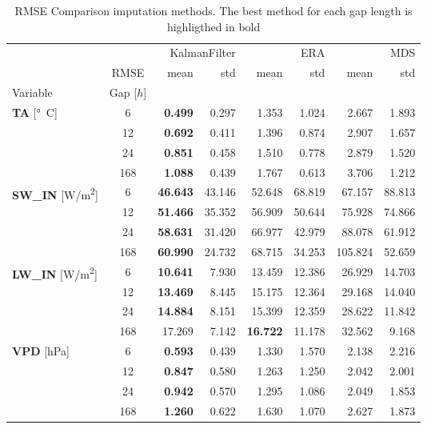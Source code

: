 \begin{table}
\centering
\caption{RMSE Comparison imputation methods. The best method for each gap length is highligthed in bold}
\label{the_table}
\begin{tabular}{p{2.1cm}c|rr|rr|rr}
\toprule
 &  & \multicolumn{2}{r}{KalmanFilter} & \multicolumn{2}{r}{ERA} & \multicolumn{2}{r}{MDS} \\
 & RMSE & mean & std & mean & std & mean & std \\
Variable & Gap [$h$] &  &  &  &  &  &  \\
\midrule
\multirow[c]{4}{*}{\parbox{2.1cm}{\textbf{TA} [\si{°C}]}} & 6 & \bfseries 0.499 & 0.297 & 1.353 & 1.024 & 2.667 & 1.893 \\
 & 12 & \bfseries 0.692 & 0.411 & 1.396 & 0.874 & 2.907 & 1.657 \\
 & 24 & \bfseries 0.851 & 0.458 & 1.510 & 0.778 & 2.879 & 1.520 \\
 & 168 & \bfseries 1.088 & 0.439 & 1.767 & 0.613 & 3.706 & 1.212 \\
\cline{1-8}
\multirow[c]{4}{*}{\parbox{2.1cm}{\textbf{SW\_IN} [\si{W/m^2}]}} & 6 & \bfseries 46.643 & 43.146 & 52.648 & 68.819 & 67.157 & 88.813 \\
 & 12 & \bfseries 51.466 & 35.352 & 56.909 & 50.644 & 75.928 & 74.866 \\
 & 24 & \bfseries 58.631 & 31.420 & 66.977 & 42.979 & 88.078 & 61.912 \\
 & 168 & \bfseries 60.990 & 24.732 & 68.715 & 34.253 & 105.824 & 52.659 \\
\cline{1-8}
\multirow[c]{4}{*}{\parbox{2.1cm}{\textbf{LW\_IN} [\si{W/m^2}]}} & 6 & \bfseries 10.641 & 7.930 & 13.459 & 12.386 & 26.929 & 14.703 \\
 & 12 & \bfseries 13.469 & 8.445 & 15.175 & 12.364 & 29.168 & 14.040 \\
 & 24 & \bfseries 14.884 & 8.151 & 15.399 & 12.359 & 28.622 & 11.842 \\
 & 168 & 17.269 & 7.142 & \bfseries 16.722 & 11.178 & 32.562 & 9.168 \\
\cline{1-8}
\multirow[c]{4}{*}{\parbox{2.1cm}{\textbf{VPD} [\si{hPa}]}} & 6 & \bfseries 0.593 & 0.439 & 1.330 & 1.570 & 2.138 & 2.216 \\
 & 12 & \bfseries 0.847 & 0.580 & 1.263 & 1.250 & 2.042 & 2.001 \\
 & 24 & \bfseries 0.942 & 0.570 & 1.295 & 1.086 & 2.049 & 1.853 \\
 & 168 & \bfseries 1.260 & 0.622 & 1.630 & 1.070 & 2.627 & 1.873 \\

\end{tabular}
\end{table}
